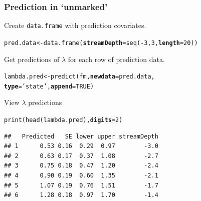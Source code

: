 \documentclass[color=usenames,dvipsnames]{beamer}\usepackage[]{graphicx}\usepackage[]{xcolor}
\makeatletter
\newcommand{\hlnum}[1]{\textcolor[rgb]{0.69,0.494,0}{#1}}%
\newcommand{\hlstr}[1]{\textcolor[rgb]{0.749,0.012,0.012}{#1}}%
\newcommand{\hlopt}[1]{\textcolor[rgb]{0,0,0}{#1}}%
\newcommand{\hlstd}[1]{\textcolor[rgb]{0,0,0}{#1}}%
\newcommand{\hlkwb}[1]{\textcolor[rgb]{0,0.341,0.682}{#1}}%
\newcommand{\hlkwc}[1]{\textcolor[rgb]{0,0,0}{\textbf{#1}}}%
\newcommand{\hlkwd}[1]{\textcolor[rgb]{0.004,0.004,0.506}{#1}}%
\newenvironment{kframe}{%
 \def\at@end@of@kframe{}%
 \ifinner\ifhmode%
  \def\at@end@of@kframe{\end{minipage}}%
  \begin{minipage}{\columnwidth}%
 \fi\fi%
 \def\FrameCommand##1{\hskip\@totalleftmargin \hskip-\fboxsep
 \colorbox{shadecolor}{##1}\hskip-\fboxsep
     \hskip-\linewidth \hskip-\@totalleftmargin \hskip\columnwidth}%
 \MakeFramed {\advance\hsize-\width
   \@totalleftmargin\z@ \linewidth\hsize
   \@setminipage}}%
 {\par\unskip\endMakeFramed%
 \at@end@of@kframe}
\newenvironment{knitrout}{}{} %
\makeatother
\begin{document}
\begin{frame}[fragile]
  \frametitle{Prediction in `unmarked'}
  \small
  Create \texttt{data.frame} with prediction covariates. 
  \vspace{-6pt}
\begin{knitrout}\footnotesize
{}\color{fgcolor}\begin{kframe}
\begin{alltt}
\hlstd{pred.data} \hlkwb{<-} \hlkwd{data.frame}\hlstd{(}\hlkwc{streamDepth}\hlstd{=}\hlkwd{seq}\hlstd{(}\hlopt{-}\hlnum{3}\hlstd{,} \hlnum{3}\hlstd{,} \hlkwc{length}\hlstd{=}\hlnum{20}\hlstd{))}
\end{alltt}
\end{kframe}
\end{knitrout}
\pause
\vfill
Get predictions of $\lambda$ for each row of prediction data.
  \vspace{-6pt}
\begin{knitrout}\footnotesize
{}\color{fgcolor}\begin{kframe}
\begin{alltt}
\hlstd{lambda.pred} \hlkwb{<-} \hlkwd{predict}\hlstd{(fm,} \hlkwc{newdata}\hlstd{=pred.data,}
                       \hlkwc{type}\hlstd{=}\hlstr{'state'}\hlstd{,} \hlkwc{append}\hlstd{=}\hlnum{TRUE}\hlstd{)}
\end{alltt}
\end{kframe}
\end{knitrout}
\pause
\vfill
  View $\lambda$ predictions
  \vspace{-6pt}
\begin{knitrout}\footnotesize
{}\color{fgcolor}\begin{kframe}
\begin{alltt}
\hlkwd{print}\hlstd{(}\hlkwd{head}\hlstd{(lambda.pred),} \hlkwc{digits}\hlstd{=}\hlnum{2}\hlstd{)}
\end{alltt}
\begin{verbatim}
##   Predicted   SE lower upper streamDepth
## 1      0.53 0.16  0.29  0.97        -3.0
## 2      0.63 0.17  0.37  1.08        -2.7
## 3      0.75 0.18  0.47  1.20        -2.4
## 4      0.90 0.19  0.60  1.35        -2.1
## 5      1.07 0.19  0.76  1.51        -1.7
## 6      1.28 0.18  0.97  1.70        -1.4
\end{verbatim}
\end{kframe}
\end{knitrout}
\end{frame}
\end{document}
